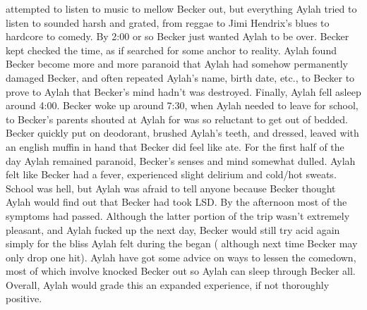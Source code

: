 \documentclass[12pt]{book}
\begin{document}
attempted to listen to music to mellow Becker out, but everything Aylah tried to listen to sounded harsh and grated, from reggae to Jimi Hendrix's blues to hardcore to comedy. By 2:00 or so Becker just wanted Aylah to be over. Becker kept checked the time, as if searched for some anchor to reality. Aylah found Becker become more and more paranoid that Aylah had somehow permanently damaged Becker, and often repeated Aylah's name, birth date, etc., to Becker to prove to Aylah that Becker's mind hadn't was destroyed. Finally, Aylah fell asleep around 4:00. Becker woke up around 7:30, when Aylah needed to leave for school, to Becker's parents shouted at Aylah for was so reluctant to get out of bedded. Becker quickly put on deodorant, brushed Aylah's teeth, and dressed, leaved with an english muffin in hand that Becker did feel like ate. For the first half of the day Aylah remained paranoid, Becker's senses and mind somewhat dulled. Aylah felt like Becker had a fever, experienced slight delirium and cold/hot sweats. School was hell, but Aylah was afraid to tell anyone because Becker thought Aylah would find out that Becker had took LSD. By the afternoon most of the symptoms had passed. Although the latter portion of the trip wasn't extremely pleasant, and Aylah fucked up the next day, Becker would still try acid again simply for the bliss Aylah felt during the began ( although next time Becker may only drop one hit). Aylah have got some advice on ways to lessen the comedown, most of which involve knocked Becker out so Aylah can sleep through Becker all. Overall, Aylah would grade this an expanded experience, if not thoroughly positive.
\end{document}
